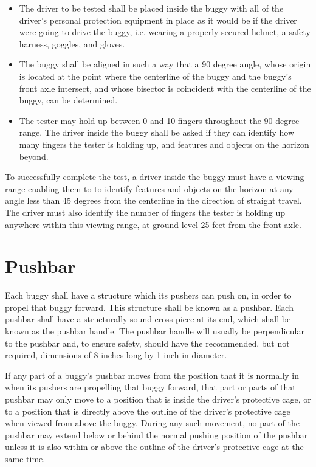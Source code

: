 	\begin{itemize}

		\item
		The driver to be tested shall be placed inside the buggy with all of the driver's personal protection equipment in place as it would be if the driver were going to drive the buggy, i.e. wearing a properly secured helmet, a safety harness, goggles, and gloves.

		\item
		The buggy shall be aligned in such a way that a 90 degree angle, whose origin is located at the point where the centerline of the buggy and the buggy's front axle intersect, and whose bisector is coincident with the centerline of the buggy, can be determined.

		\item
		The tester may hold up between 0 and 10 fingers throughout the 90 degree range. The driver inside the buggy shall be asked if they can identify how many fingers the tester is holding up, and features and objects on the horizon beyond.

	\end{itemize}

	To successfully complete the test, a driver inside the buggy must have a viewing range enabling them to to identify features and objects on the horizon at any angle less than 45 degrees from the centerline in the direction of straight travel. The driver must also identify the number of fingers the tester is holding up anywhere within this viewing range, at ground level 25 feet from the front axle.

\section{Pushbar}

	Each buggy shall have a structure which its pushers can push on, in order to propel that buggy forward. This structure shall be known as a pushbar. Each pushbar shall have a structurally sound cross-piece at its end, which shall be known as the pushbar handle. The pushbar handle will usually be perpendicular to the pushbar and, to ensure safety, should have the recommended, but not required, dimensions of 8 inches long by 1 inch in diameter.

	If any part of a buggy's pushbar moves from the position that it is normally in when its pushers are propelling that buggy forward, that part or parts of that pushbar may only move to a position that is inside the driver's protective cage, or to a position that is directly above the outline of the driver's protective cage when viewed from above the buggy. During any such movement, no part of the pushbar may extend below or behind the normal pushing position of the pushbar unless it is also within or above the outline of the driver's protective cage at the same time.


